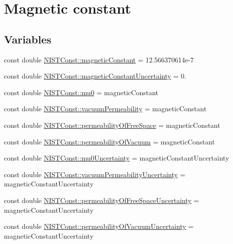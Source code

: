 \hypertarget{group___n_i_s_t_const-_magnetic_constant}{}\section{Magnetic constant}
\label{group___n_i_s_t_const-_magnetic_constant}
\subsection*{Variables}
\begin{DoxyCompactItemize}
\item 
const double \hyperlink{group___n_i_s_t_const-_magnetic_constant_ga511860d1f2830ae6a85e1b1df8522071}{N\+I\+S\+T\+Const\+::magnetic\+Constant} = 12.\+566370614e-\/7
\item 
const double \hyperlink{group___n_i_s_t_const-_magnetic_constant_ga17f91f2aa414afe44a0bc84825034a4e}{N\+I\+S\+T\+Const\+::magnetic\+Constant\+Uncertainty} = 0.
\item 
const double \hyperlink{group___n_i_s_t_const-_magnetic_constant_gaee4806f14e9b0f48347b2d29ddcd2668}{N\+I\+S\+T\+Const\+::mu0} = magnetic\+Constant
\item 
const double \hyperlink{group___n_i_s_t_const-_magnetic_constant_ga2bf51bbe9c6b75752250c9b133758223}{N\+I\+S\+T\+Const\+::vacuum\+Permeability} = magnetic\+Constant
\item 
const double \hyperlink{group___n_i_s_t_const-_magnetic_constant_gad7321a170873a7532ecfb8383d827d1e}{N\+I\+S\+T\+Const\+::permeability\+Of\+Free\+Space} = magnetic\+Constant
\item 
const double \hyperlink{group___n_i_s_t_const-_magnetic_constant_ga7210c41dfc8fb9dbc41c83282eafebc6}{N\+I\+S\+T\+Const\+::permeability\+Of\+Vacuum} = magnetic\+Constant
\item 
const double \hyperlink{group___n_i_s_t_const-_magnetic_constant_ga8c9dd97d5f05e75e3eb2b2daaa0e1b7e}{N\+I\+S\+T\+Const\+::mu0\+Uncertainty} = magnetic\+Constant\+Uncertainty
\item 
const double \hyperlink{group___n_i_s_t_const-_magnetic_constant_gaf9ad0468a42a06fab2ba9738f20aa68b}{N\+I\+S\+T\+Const\+::vacuum\+Permeability\+Uncertainty} = magnetic\+Constant\+Uncertainty
\item 
const double \hyperlink{group___n_i_s_t_const-_magnetic_constant_gab95a7a90e35194a4d31736c375e57bde}{N\+I\+S\+T\+Const\+::permeability\+Of\+Free\+Space\+Uncertainty} = magnetic\+Constant\+Uncertainty
\item 
const double \hyperlink{group___n_i_s_t_const-_magnetic_constant_gaa30d6a001f3d52ea07c50ff9c921c8e9}{N\+I\+S\+T\+Const\+::permeability\+Of\+Vacuum\+Uncertainty} = magnetic\+Constant\+Uncertainty
\end{DoxyCompactItemize}


